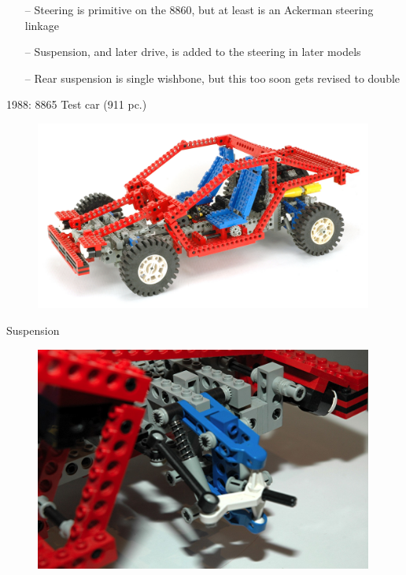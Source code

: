 \documentclass[xcolor=dvipsnames]{beamer}
\begin{document}
\begin{frame}[fragile]{}
\begin{itemize}
\item[--] Steering is primitive on the 8860, but at least is an Ackerman steering linkage \vspace{3mm}
\item[--] Suspension, and later drive, is added to the steering in later models \vspace{3mm}
\item[--] Rear suspension is single wishbone, but this too soon gets revised to double \vspace{3mm}
\end{itemize}
\end{frame}




\begin{frame}[fragile]{1988: 8865 Test car (911 pc.)}
\begin{figure}[H]
 \centering
 \includegraphics[width=0.99\textwidth]{1988_8865_car.jpg}
\end{figure}
\end{frame}

\begin{frame}[fragile]{Suspension}
\begin{figure}[H]
 \centering
 \includegraphics[width=0.99\textwidth]{1988_8865_car_front_suspension.jpg}
\end{figure}
\end{frame}
\end{document}
